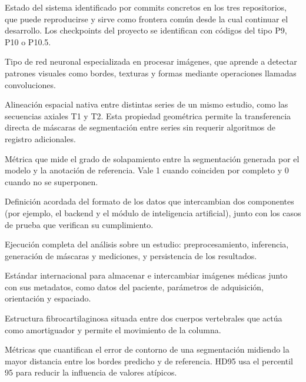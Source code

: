 \begin{description}[leftmargin=3.8cm, style=nextline, itemsep=3pt, topsep=3pt]
    \item[Checkpoint] Estado del sistema identificado por commits concretos en los tres repositorios, que puede reproducirse y sirve como frontera común desde la cual continuar el desarrollo. Los checkpoints del proyecto se identifican con códigos del tipo P9, P10 o P10.5.

    \item[CNN, red neuronal convolucional] Tipo de red neuronal especializada en procesar imágenes, que aprende a detectar patrones visuales como bordes, texturas y formas mediante operaciones llamadas convoluciones.

    \item[Co-registro DICOM] Alineación espacial nativa entre distintas series de un mismo estudio, como las secuencias axiales T1 y T2. Esta propiedad geométrica permite la transferencia directa de máscaras de segmentación entre series sin requerir algoritmos de registro adicionales.

    \item[Coeficiente Dice] Métrica que mide el grado de solapamiento entre la segmentación generada por el modelo y la anotación de referencia. Vale 1 cuando coinciden por completo y 0 cuando no se superponen.

    \item[Contrato] Definición acordada del formato de los datos que intercambian dos componentes (por ejemplo, el backend y el módulo de inteligencia artificial), junto con los casos de prueba que verifican su cumplimiento.

    \item[Corrida] Ejecución completa del análisis sobre un estudio: preprocesamiento, inferencia, generación de máscaras y mediciones, y persistencia de los resultados.

    \item[DICOM] Estándar internacional para almacenar e intercambiar imágenes médicas junto con sus metadatos, como datos del paciente, parámetros de adquisición, orientación y espaciado.

    \item[Disco intervertebral] Estructura fibrocartilaginosa situada entre dos cuerpos vertebrales que actúa como amortiguador y permite el movimiento de la columna.

    \item[Distancia de Hausdorff y HD95] Métricas que cuantifican el error de contorno de una segmentación midiendo la mayor distancia entre los bordes predicho y de referencia. HD95 usa el percentil 95 para reducir la influencia de valores atípicos.


\end{description}
